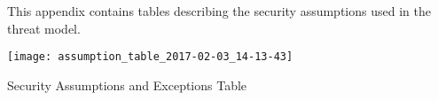 

This appendix contains tables describing the security assumptions used in the
threat model.

\begin{table*}[h]
    \texttt{[image: assumption\_table\_2017-02-03\_14-13-43]}
    \caption{Security Assumptions and Exceptions Table}
    \label{tab:sec_assumpt}
\end{table*}

\vfill